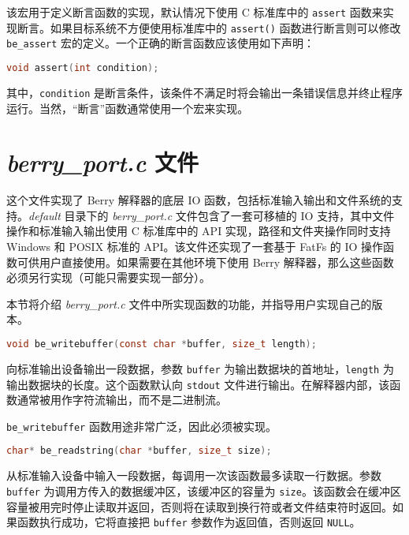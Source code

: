 
该宏用于定义断言函数的实现，默认情况下使用 C 标准库中的 \texttt{assert} 函数来实现断言。如果目标系统不方便使用标准库中的 \texttt{assert()} 函数进行断言则可以修改 \texttt{be\_assert} 宏的定义。一个正确的断言函数应该使用如下声明：

\begin{lstlisting}[language=c, numbers=none]
void assert(int condition);
\end{lstlisting}

其中，\texttt{condition} 是断言条件，该条件不满足时将会输出一条错误信息并终止程序运行。当然，“断言”函数通常使用一个宏来实现。

\section{\textsl{berry\_port.c} 文件}

这个文件实现了 Berry 解释器的底层 IO 函数，包括标准输入输出和文件系统的支持。\textsl{default} 目录下的 \textsl{berry\_port.c} 文件包含了一套可移植的 IO 支持，其中文件操作和标准输入输出使用 C 标准库中的 API 实现，路径和文件夹操作同时支持 Windows 和 POSIX 标准的 API。该文件还实现了一套基于 FatFs 的 IO 操作函数可供用户直接使用。如果需要在其他环境下使用 Berry 解释器，那么这些函数必须另行实现（可能只需要实现一部分）。

本节将介绍 \textsl{berry\_port.c} 文件中所实现函数的功能，并指导用户实现自己的版本。


\begin{lstlisting}[language=c, numbers=none]
void be_writebuffer(const char *buffer, size_t length);
\end{lstlisting}

向标准输出设备输出一段数据，参数 \texttt{buffer} 为输出数据块的首地址，\texttt{length} 为输出数据块的长度。这个函数默认向 \texttt{stdout} 文件进行输出。在解释器内部，该函数通常被用作字符流输出，而不是二进制流。

\texttt{be\_writebuffer} 函数用途非常广泛，因此必须被实现。


\begin{lstlisting}[language=c, numbers=none]
char* be_readstring(char *buffer, size_t size);
\end{lstlisting}

从标准输入设备中输入一段数据，每调用一次该函数最多读取一行数据。参数 \texttt{buffer} 为调用方传入的数据缓冲区，该缓冲区的容量为 \texttt{size}。该函数会在缓冲区容量被用完时停止读取并返回，否则将在读取到换行符或者文件结束符时返回。如果函数执行成功，它将直接把 \texttt{buffer} 参数作为返回值，否则返回 \texttt{NULL}。

